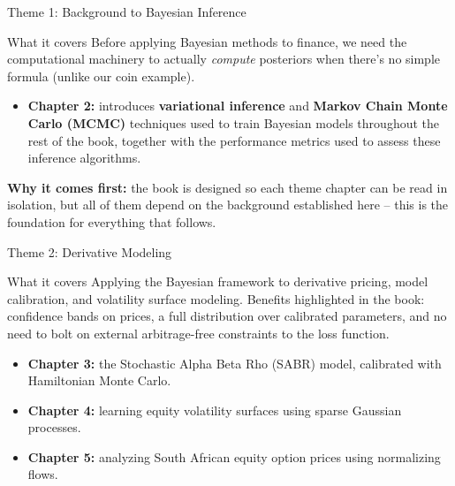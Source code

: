 \documentclass[aspectratio=169,10pt]{beamer}
\begin{document}
\begin{frame}{Theme 1: Background to Bayesian Inference}
  \begin{block}{What it covers}
    Before applying Bayesian methods to finance, we need the computational
    machinery to actually \emph{compute} posteriors when there's no simple
    formula (unlike our coin example).
  \end{block}
  \begin{itemize}
    \item \textbf{Chapter 2:} introduces \textbf{variational inference} and
    \textbf{Markov Chain Monte Carlo (MCMC)} techniques used to train
    Bayesian models throughout the rest of the book, together with the
    performance metrics used to assess these inference algorithms.
  \end{itemize}
  \textbf{Why it comes first:} the book is designed so each theme chapter
  can be read in isolation, but all of them depend on the background
  established here -- this is the foundation for everything that follows.
\end{frame}

\begin{frame}{Theme 2: Derivative Modeling}
  \begin{block}{What it covers}
    Applying the Bayesian framework to derivative pricing, model
    calibration, and volatility surface modeling. Benefits highlighted in
    the book: confidence bands on prices, a full distribution over
    calibrated parameters, and no need to bolt on external arbitrage-free
    constraints to the loss function.
  \end{block}
  \begin{itemize}
    \item \textbf{Chapter 3:} the Stochastic Alpha Beta Rho (SABR) model,
    calibrated with Hamiltonian Monte Carlo.
    \item \textbf{Chapter 4:} learning equity volatility surfaces using
    sparse Gaussian processes.
    \item \textbf{Chapter 5:} analyzing South African equity option prices
    using normalizing flows.
  \end{itemize}
\end{frame}
\end{document}
